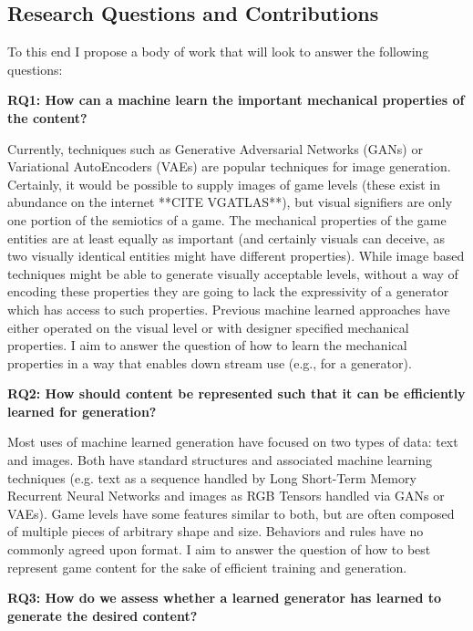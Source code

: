 \documentclass[12pt]{report}
\begin{document}
\subsection*{Research Questions and Contributions}

To this end I propose a body of work that will look to answer the following questions:

\textbf{RQ1: How can a machine learn the important mechanical properties of the content?}

Currently, techniques such as Generative Adversarial Networks (GANs) or Variational AutoEncoders (VAEs) are popular techniques for image generation.  Certainly, it would be possible to supply images of game levels (these exist in abundance on the internet **CITE VGATLAS**), but visual signifiers are only one portion of the semiotics of a game.  The mechanical properties of the game entities are at least equally as important (and certainly visuals can deceive, as two visually identical entities might have different properties).  While image based techniques might be able to generate visually acceptable levels, without a way of encoding these properties they are going to lack the expressivity of a generator which has access to such properties.  Previous machine learned approaches have either operated on the visual level or with designer specified mechanical properties.   I aim to answer the question of how to learn the mechanical properties in a way that enables down stream use (e.g., for a generator).


\textbf{RQ2: How should content be represented such that it can be efficiently learned for generation?}

Most uses of machine learned generation have focused on two types of data: text and images.  Both have standard structures and associated machine learning techniques (e.g. text as a sequence handled by Long Short-Term Memory Recurrent Neural Networks and images as RGB Tensors handled via GANs or VAEs).  Game levels have some features similar to both, but are often composed of multiple pieces of arbitrary shape and size.  Behaviors and rules have no commonly agreed upon format.  I aim to answer the question of how to best represent game content for the sake of efficient training and generation.

\textbf{RQ3: How do we assess whether a learned generator has learned to generate the desired content?}
\end{document}
